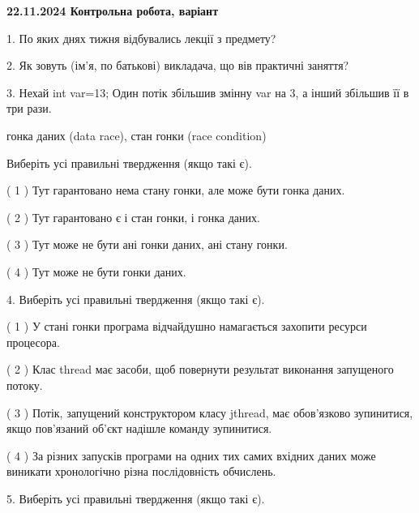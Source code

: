 \documentclass[12pt, ukrainian]{article}
\begin{document}
\vspace{4mm}
\newpage
\begin {large}

\textbf{22.11.2024 Контрольна робота, варіант  }\par


{
1. По яких днях тижня відбувались лекції з предмету?



\vspace{5mm}
2. Як зовуть (ім'я, по батькові) викладача, що вів практичні заняття?



\vspace{5mm}
3. Нехай int var=13; Один потік збільшив змінну var на 3, а інший збільшив її в три рази.

гонка даних (data race), стан гонки (race condition)

Виберіть усі правильні твердження (якщо такі є).\par
\vspace{2mm}
( 1 ) Тут гарантовано нема стану гонки, але може бути гонка даних.%

( 2 ) Тут гарантовано є і стан гонки, і гонка даних.%

( 3 ) Тут може не бути ані гонки даних, ані стану гонки.%

( 4 ) Тут може не бути гонки даних.%


\vspace{5mm}
4. Виберіть усі правильні твердження (якщо такі є).\par
\vspace{2mm}

( 1 ) У стані гонки програма відчайдушно намагається захопити ресурси процесора.%

( 2 ) Клас thread має засоби, щоб повернути результат виконання запущеного потоку.%

( 3 ) Потік, запущений конструктором класу jthread, має обов’язково зупинитися, якщо пов’язаний об’єкт надішле команду зупинитися.%

( 4 ) За різних запусків програми на одних тих самих вхідних даних може виникати хронологічно різна послідовність обчислень.%


\vspace{5mm}
5. Виберіть усі правильні твердження (якщо такі є).\par
\vspace{2mm}

}
\end{large}
\end{document}
